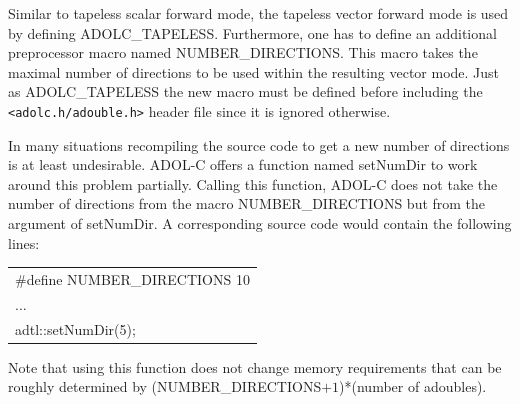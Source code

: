 \documentclass[11pt,twoside]{article}
\begin{document}
Similar to tapeless scalar forward mode, the tapeless vector forward
mode is used by defining {\sf ADOLC\_TAPELESS}. Furthermore, one has to define
an additional preprocessor macro named {\sf NUMBER\_DIRECTIONS}. This
macro takes the maximal number of directions to be used within the 
resulting vector mode. Just as {\sf ADOLC\_TAPELESS} the new macro
must be defined before including the \verb#<adolc.h/adouble.h>#
header file since it is ignored otherwise. 

In many situations recompiling the source code to get a new number of
directions is at least undesirable. ADOL-C offers a function named
{\sf setNumDir} to work around this problem partially. Calling this
function, ADOL-C does not take the number of directions
from the macro {\sf NUMBER\_DIRECTIONS} but from the argument of
{\sf setNumDir}. A corresponding source code would contain the following lines:  
\begin{center}
  \begin{tabular}{l}
    {\sf \#define NUMBER\_DIRECTIONS 10}\\
    ...\\
    {\sf adtl::setNumDir(5);}
  \end{tabular}
\end{center}
Note that using this function does not
change memory requirements that can be roughly determined by
({\sf NUMBER\_DIRECTIONS}$+1$)*(number of {\sf adouble}s). 
\end{document}
